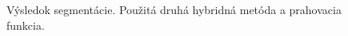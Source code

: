 \documentclass[a4paper,11pt,oneside]{article}%
\begin{document}
\begin{figure}[H]
    \hspace{5px}
    \hspace{5px}
    \caption{Výsledok segmentácie. Použitá druhá hybridná metóda a prahovacia funkcia.}
    \label{fig:hybrid2_tf}
\end{figure}
\end{document}
